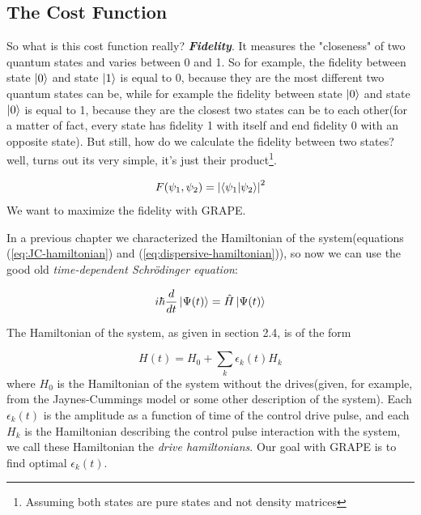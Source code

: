 \documentclass[english, a4paper, 12pt, twoside]{article}
\numberwithin{equation}{section} %
\begin{document}
\subsection{The Cost Function}
So what is this cost function really? \textit{\textbf{Fidelity}}. It measures the "closeness" of two quantum states and varies between 0 and 1. So for example, the fidelity between state $\ket{0}$ and state $\ket{1}$ is equal to 0, because they are the most different two quantum states can be, while for example the fidelity between state $\ket{0}$ and state $\ket{0}$ is equal to 1, because they are the closest two states can be to each other(for a matter of fact, every state has fidelity 1 with itself and end fidelity 0 with an opposite state). But still, how do we calculate the fidelity between two states? well, turns out its very simple, it's just their product\footnote{Assuming both states are pure states and not density matrices}.

\begin{equation} \label{def:fid}
F(\psi_1, \psi_2) = \abs{\braket{\psi_1}{\psi_2}}^2
\end{equation}
We want to maximize the fidelity with GRAPE.

In a previous chapter we characterized the Hamiltonian of the system(equations (\ref{eq:JC-hamiltonian}) and (\ref{eq:dispersive-hamiltonian})), so now we can use the good old \textit{time-dependent Schr\"{o}dinger equation}:

\begin{equation}
i\hbar\frac{d}{dt}\ket{\Psi(t)} = \hat{H}\ket{\Psi(t)}
\end{equation}

The Hamiltonian of the system, as given in section 2.4, is of the  form %

\begin{equation} \label{eq:hamiltonianl_form}
H(t) = H_0 + \sum_k{\epsilon_k(t) H_k} %
\end{equation}
where $H_0$ is the Hamiltonian of the system without the drives(given, for example, from the Jaynes-Cummings model or some other description of the system). Each $\epsilon_k(t)$ is the amplitude as a function of time of the control drive pulse, and each $H_k$ is the Hamiltonian describing the control pulse interaction with the system, we call these Hamiltonian the \textit{drive hamiltonians}. Our goal with GRAPE is to find optimal $\epsilon_k(t)$.
\end{document}
